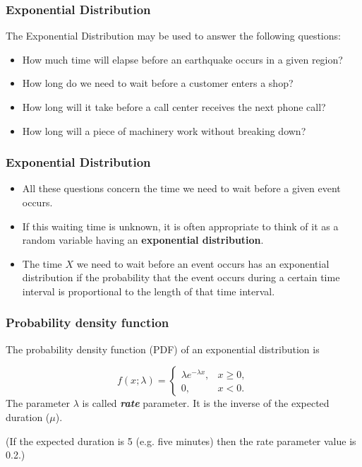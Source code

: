 \documentclass[IntroMain.tex]{subfiles}
\begin{document}

\begin{frame}[fragile]
\frametitle{Exponential Distribution}
\Large
The Exponential Distribution may be used to answer the following questions:
\begin{itemize}
\item How much time will elapse before an earthquake occurs in a given region?
\item How long do we need to wait before a customer enters a shop?
\item How long will it take before a call center receives the next phone call?
\item How long will a piece of machinery work without breaking down?
\end{itemize}
\end{frame}

\begin{frame}[fragile]
\frametitle{Exponential Distribution}
\Large
\begin{itemize}
\item All these questions concern the time we need to wait before a given event occurs. 
\item If this waiting time is unknown, it is often appropriate to think of it as a random variable having an \textbf{exponential distribution}.
\item The time $X$ we need to wait before an event occurs has an exponential distribution if the probability that the event occurs during a certain time interval is proportional to the length of that time interval.

\end{itemize}
\end{frame}

\begin{frame}[fragile]
\frametitle{Probability density function}
\Large
The probability density function (PDF) of an exponential distribution is

\[
f(x;\lambda) = \begin{cases}
\lambda e^{-\lambda x}, & x \ge 0, \\
0, & x < 0.
\end{cases}\]
The parameter $\lambda$  is called \textbf{\emph{rate}} parameter. It is the inverse of the expected duration ($\mu$).\\ \bigskip

(If the expected duration is 5 (e.g. five minutes) then the rate parameter value is 0.2.)
\end{frame}
\end{document}

